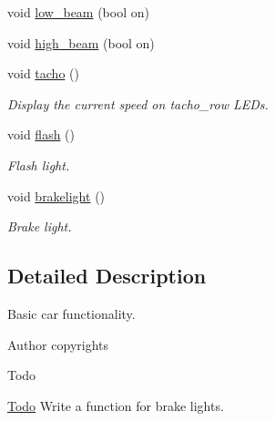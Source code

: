 \begin{DoxyCompactItemize}
void \hyperlink{group__car_ga29d5eff542aae0196b8e84b8a752e1df}{low\+\_\+beam} (bool on)
\item 
void \hyperlink{group__car_ga1088d06b4ab015d579e0ac2510d39f25}{high\+\_\+beam} (bool on)
\item 
void \hyperlink{group__car_gac7295d1018b2b948084ba5dbacf09d74}{tacho} ()
\begin{DoxyCompactList}\small\item\em Display the current speed on tacho\+\_\+row L\+E\+Ds. \end{DoxyCompactList}\item 
void \hyperlink{group__car_gaffb7c011f82f3fb47b39ebb2713a1cd8}{flash} ()
\begin{DoxyCompactList}\small\item\em Flash light. \end{DoxyCompactList}\item 
void \hyperlink{group__car_ga1ac48972153097ad7a16fffc032fc5f1}{brakelight} ()
\begin{DoxyCompactList}\small\item\em Brake light. \end{DoxyCompactList}\end{DoxyCompactItemize}


\subsection{Detailed Description}
Basic car functionality. 

\begin{DoxyAuthor}{Author}
copyrights 
\end{DoxyAuthor}
\begin{DoxyRefDesc}{Todo}
\item[\hyperlink{todo__todo000001}{Todo}]Write a function for brake lights. \end{DoxyRefDesc}
